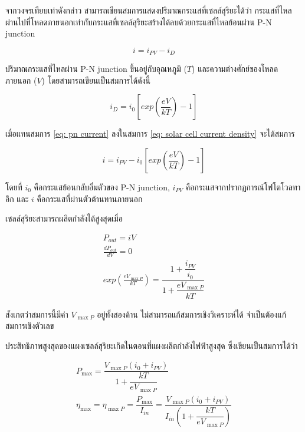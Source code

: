 \documentclass[11pt]{article}
\begin{document}
จากวงจรเทียบเท่าดังกล่าว สามารถเขียนสมการแสดงปริมาณกระแสที่เซลล์สุริยะได้ว่า กระแสที่ไหลผ่านไปที่โหลดภายนอกเท่ากับกระแสที่เซลล์สุริยะสร้างได้ลบด้วยกระแสที่ไหลย้อนผ่าน P-N junction

$$ i = i_{PV} - i_D $$

ปริมาณกระแสที่ไหลผ่าน P-N junction ขึ้นอยู่กับอุณหภูมิ (\(T\)) และความต่างศักย์ของโหลดภายนอก (\(V\)) โดยสามารถเขียนเป็นสมการได้ดังนี้

\begin{equation}
  \label{eq: pn current}
  i_D = i_0 \left[ exp \left( \frac{eV}{kT} \right) - 1 \right]
\end{equation}

เมื่อแทนสมการ \ref{eq: pn current} ลงในสมการ \ref{eq: solar cell current density} จะได้สมการ

\begin{equation}
  \label{eq: solar cell current}
    i = i_{PV} - i_0\left[exp \left( \frac{eV}{kT} \right) - 1 \right]
\end{equation}

โดยที่ \(i_0\) คือกระแสย้อนกลับอิ่มตัวของ P-N junction, \(i_{PV}\) คือกระแสจากปรากฏการณ์โฟโตโวลทาอิก และ \(i\) คือกระแสที่ผ่านตัวต้านทานภายนอก 

เซลล์สุริยะสามารถผลิตกำลังได้สูงสุดเมื่อ

\begin{gather}
  \label{eq: max solar cell power}
   	P_{out} = i V \nonumber \\
    \frac{dP_{out}}{dV} = 0 \nonumber \\
   	exp \left(\frac{e V_{\max P}}{kT} \right) = \dfrac{1+\dfrac{i_{PV}}{i_0}}{1+ \dfrac{e V_{\max P}}{kT}}
\end{gather}

สังเกตว่าสมการนี้มีค่า \(V_{\max P}\) อยู่ทั้งสองด้าน ไม่สามารถแก้สมการเชิงวิเคราะห์ได้ จำเป็นต้องแก้สมการเชิงตัวเลข

ประสิทธิภาพสูงสุดของแผงเซลล์สุริยะเกิดในตอนที่แผงผลิตกำลังไฟฟ้าสูงสุด ซึ่งเขียนเป็นสมการได้ว่า

\begin{gather}
  \label{eq: solar cell max eff}
  P_{\max} =  \dfrac{V_{\max P} ( i_0 + i_{PV} )}{1 + \dfrac{kT}{e V_{\max P}}} \\
  \eta_{\max} = \eta_{\max P} =  \dfrac{P_{\max}}{I_{in}} = \dfrac{V_{\max P} ( i_0 + i_{PV} )}{I_{in} \left(1 + \dfrac{kT}{e V_{\max P}} \right)}
\end{gather}
\end{document}
